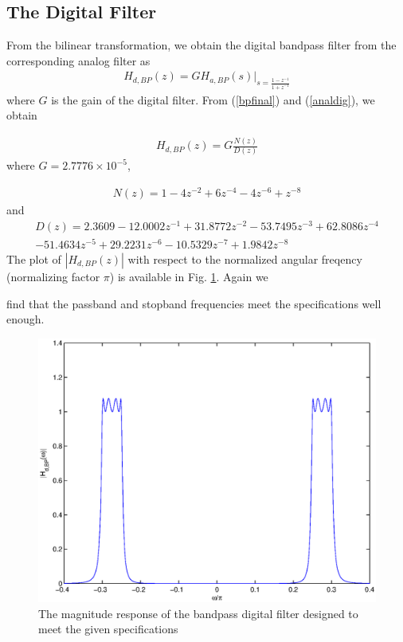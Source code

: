 \documentclass{article}
\begin{document}
\subsection{The Digital Filter}
From the bilinear transformation, we obtain the digital bandpass filter from the corresponding analog filter as
\begin{eqnarray}
\label{analdig}
H_{d,BP}(z) = GH_{a,BP}(s)\vert_{s = \frac{1-z^{-1}}{1 + z^{-1}}}
\end{eqnarray}
where $G$ is the gain of the digital filter.  From (\ref{bpfinal}) and (\ref{analdig}), we obtain

\begin{eqnarray}
H_{d,BP}(z) = G \frac{N(z)}{D(z)}
\end{eqnarray}
where $G = 2.7776 \times 10^{-5}$,

\begin{eqnarray}
N(z)=  1 - 4 z^{-2} + 6 z^{-4} - 4z^{-6} + z^{-8} 
\end{eqnarray}
and
\begin{eqnarray}
D(z) = 2.3609  -12.0002z^{-1} + 31.8772z^{-2}  -53.7495z^{-3}+  62.8086z^{-4}\nonumber \\
  -51.4634z^{-5}+   29.2231z^{-6}  -10.5329z^{-7} +   1.9842z^{-8}
\end{eqnarray}
The plot of $|H_{d,BP}(z)|$ with respect to the normalized angular freqency (normalizing factor $\pi$) is available in Fig. \ref{filtdesign/writeup/figs/fig4}.  Again we
	
	
find that the passband and stopband frequencies meet the specifications well enough.

\begin{figure}
\includegraphics[width = \columnwidth]{filtdesign/writeup/figs/fig4.eps}
\caption{The magnitude response of the bandpass digital filter designed to meet the given specifications} 
	\label{filtdesign/writeup/figs/fig4}
\end{figure}
\end{document}
